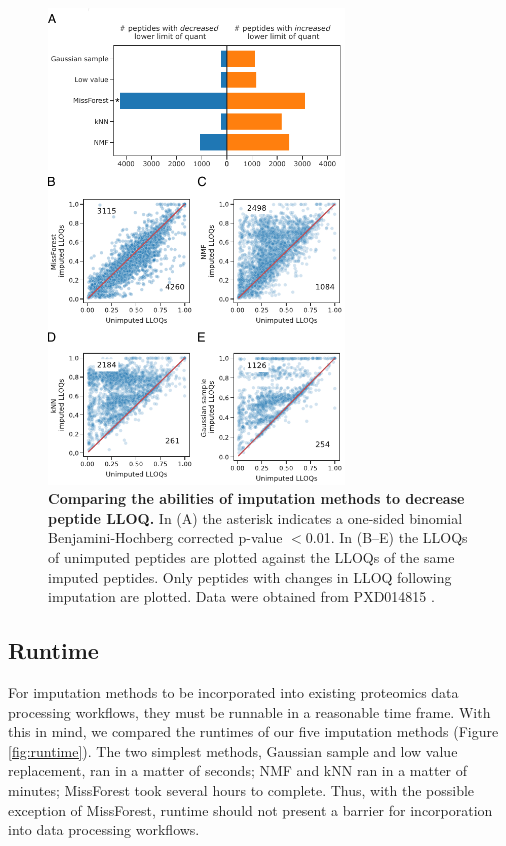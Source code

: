 \documentclass{article}
\begin{document}
\begin{figure}
  \centering
  \includegraphics[width=0.7\textwidth]{figures/lloqs-figure.pdf}
  \caption{{\bf Comparing the abilities of imputation methods to decrease peptide LLOQ.}  In (A) the asterisk indicates a one-sided binomial Benjamini-Hochberg corrected p-value $<$0.01. In (B--E) the LLOQs of unimputed peptides are plotted against the LLOQs of the same imputed peptides. Only peptides with changes in LLOQ following imputation are plotted. Data were obtained from PXD014815 \cite{matrix-matched-calib}.}
  \label{fig:lloq}
\end{figure}

\subsection{Runtime}

For imputation methods to be incorporated into existing proteomics data processing workflows, they must be runnable in a reasonable time frame. With this in mind, we compared the runtimes of our five imputation methods (Figure \ref{fig:runtime}). The two simplest methods, Gaussian sample and low value replacement, ran in a matter of seconds; NMF and kNN ran in a matter of minutes; MissForest took several hours to complete. Thus, with the possible exception of MissForest, runtime should not present a barrier for incorporation into data processing workflows.
\end{document}
